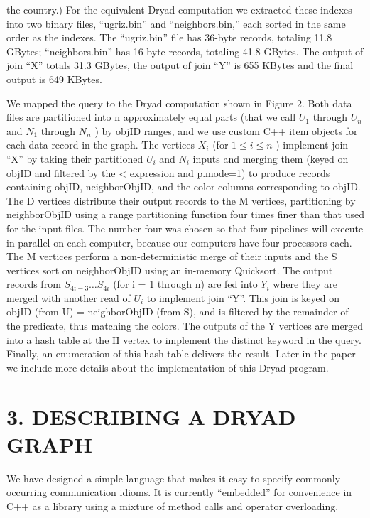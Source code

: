 \documentclass[
]{article}
\begin{document}
the country.) For the equivalent Dryad computation we extracted these
indexes into two binary files, ``ugriz.bin'' and ``neighbors.bin,'' each
sorted in the same order as the indexes. The ``ugriz.bin'' file has
36-byte records, totaling 11.8 GBytes; ``neighbors.bin'' has 16-byte
records, totaling 41.8 GBytes. The output of join ``X'' totals 31.3
GBytes, the output of join ``Y'' is 655 KBytes and the final output is
649 KBytes.

We mapped the query to the Dryad computation shown in Figure 2. Both
data files are partitioned into n approximately equal parts (that we
call \(U_{1}\) through \(U_{n}\) and \(N_{1}\) through \(N_{n}\) ) by
objID ranges, and we use custom C++ item objects for each data record in
the graph. The vertices \(X_{i}\) (for \(1 \leq i \leq n\) ) implement
join ``X'' by taking their partitioned \(U_{i}\) and \(N_{i}\) inputs
and merging them (keyed on objID and filtered by the \textless{}
expression and p.mode=1) to produce records containing objID,
neighborObjID, and the color columns corresponding to objID. The D
vertices distribute their output records to the M vertices, partitioning
by neighborObjID using a range partitioning function four times finer
than that used for the input files. The number four was chosen so that
four pipelines will execute in parallel on each computer, because our
computers have four processors each. The M vertices perform a
non-deterministic merge of their inputs and the S vertices sort on
neighborObjID using an in-memory Quicksort. The output records from
\(S_{4i-3} \ldots S_{4i}\) (for i = 1 through n) are fed into \(Y_i\)
where they are merged with another read of \(U_i\) to implement join
``Y''. This join is keyed on objID (from U) = neighborObjID (from S),
and is filtered by the remainder of the predicate, thus matching the
colors. The outputs of the Y vertices are merged into a hash table at
the H vertex to implement the distinct keyword in the query. Finally, an
enumeration of this hash table delivers the result. Later in the paper
we include more details about the implementation of this Dryad program.

\section{3. DESCRIBING A DRYAD GRAPH}\label{describing-a-dryad-graph}

We have designed a simple language that makes it easy to specify
commonly-occurring communication idioms. It is currently ``embedded''
for convenience in C++ as a library using a mixture of method calls and
operator overloading.
\end{document}

